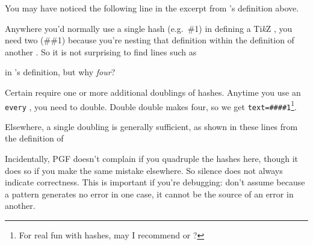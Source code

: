 \documentclass[10pt,british,a4paper]{ltxdoc}
\newcommand*\pkg[1]{\textpkg{#1}}
\newcommand*\TikZ{Ti\emph{k}Z}
\newcommand*\pgf{PGF}
\begin{document}
You may have noticed the following line in the excerpt from 's definition above.
Anywhere you'd normally use a single hash (e.g.~\#1) in defining a \TikZ{} \stylelabelname{}, you need two (\#\#1) because you're nesting that definition within the definition of another \stylelabelname{}.
So it is not surprising to find lines such as
in 's definition, but why \emph{four}?

Certain \keyslabelname{} require one or more additional doublings of hashes.
Anytime you use an \texttt{every} \keylabelname{}, you need to double.
Double double makes four, so we get \texttt{text=\#\#\#\#1}\footnote{%
  For real fun with hashes, may I recommend \pkg{prooftrees} or \pkg{forest}?}.


Elsewhere, a single doubling is generally sufficient, as shown in these lines from the definition of 
Incidentally, \pgf{} doesn't complain if you quadruple the hashes here, though it does so if you make the same mistake elsewhere.
So silence does not always indicate correctness.
This is important if you're debugging: don't assume because a pattern generates no error in one case, it cannot be the source of an error in another.
\end{document}
